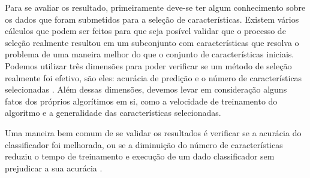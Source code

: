 Para se avaliar os resultado, primeiramente deve-se ter algum conhecimento sobre os dados que foram submetidos para a seleção de características. Existem vários cálculos que podem ser feitos para que seja posível validar que o processo de seleção realmente resultou em um subconjunto com características que resolva o problema de uma maneira melhor do que o conjunto de características iniciais. Podemos utilizar três dimensões para poder verificar se um método de seleção realmente foi efetivo, são eles: acurácia de predição e o número de características selecionadas \cite{huan_1998}. Além dessas dimensões, devemos levar em consideração alguns fatos dos próprios algorítimos em si, como a velocidade de treinamento do algoritmo e a generalidade das características selecionadas. 

Uma maneira bem comum de se validar os resultados é verificar se a acurácia do classificador foi melhorada, ou se a diminuição do número de características reduziu o tempo de treinamento e execução de um dado classificador sem prejudicar a sua acurácia \cite{liu_2005}.

